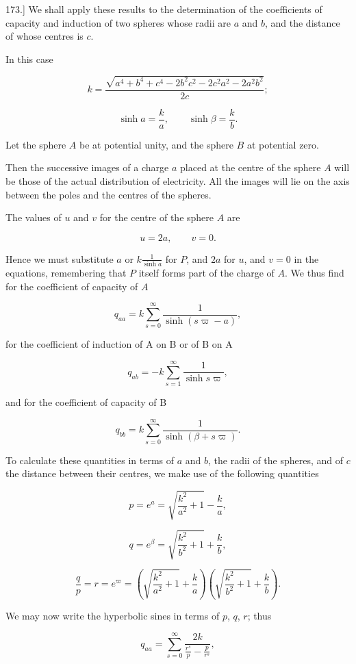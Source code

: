\documentclass[11pt,a4paper]{article}
\begin{document}
173.] We shall apply these results to the determination of the
coefficients of capacity and induction of two spheres whose radii are
$a$ and $b$, and the distance of whose centres is $c$.

In this case

\[
k = \frac{\sqrt{a^4 + b^4 + c^4 - 2b^2c^2 - 2c^2a^2 - 2a^2b^2}}{2c};
\]
  
\[
\sinh a=\frac{k}{a},\qquad \sinh\beta=\frac{k}{b}.
\]

Let the sphere $A$ be at potential unity, and the sphere $B$ at
potential zero.

Then the successive images of a charge $a$ placed at the centre of the
sphere $A$ will be those of the actual distribution of electricity. All
the images will lie on the axis between the poles and the centres of
the spheres.

The values of $u$ and $v$ for the centre of the sphere $A$ are

\[
u=2a, \qquad v=0.
\]

Hence we must substitute $a$ or $k\frac{1}{\sinh a}$ for $P$, and $2a$
for $u$, and $v=0$ in the equations, remembering that $P$ itself forms
part of the charge of $A$. We thus find for the coefficient of capacity
of $A$

\[
q_{aa}=k\sum_{s=0}^{\infty}\frac{1}{\sinh(s\varpi-a)},
\]

for the coefficient of induction of A on B or of B on A

\[
q_{ab}=-k\sum_{s=1}^{\infty}\frac{1}{\sinh s\varpi},
\]

and for the coefficient of capacity of B

\[
q_{bb}=k\sum_{s=0}^{\infty}\frac{1}{\sinh(\beta+s\varpi)}.
\]

To calculate these quantities in terms of $a$ and $b$, the radii of
the spheres, and of $c$ the distance between their centres, we make use
of the following quantities

\[
p = e^{a} = \sqrt{\frac{k^2}{a^2} + 1} - \frac{k}{a},
\]

\[
q = e^{\beta} = \sqrt{\frac{k^2}{b^2} + 1} + \frac{k}{b},
\]

\[
\frac{q}{p}=r=e^\varpi
=\left(\sqrt{\frac{k^2}{a^2}+1}+\frac{k}{a}\right)
\left(\sqrt{\frac{k^2}{b^2}+1}+\frac{k}{b}\right).
\]

We may now write the hyperbolic sines in terms of $p$, $q$, $r$; thus

\[
q_{aa}=\sum_{s=0}^{\infty}\frac{2k}{\frac{r^s}{p}-\frac{p}{r^s}},
\]
\end{document}

